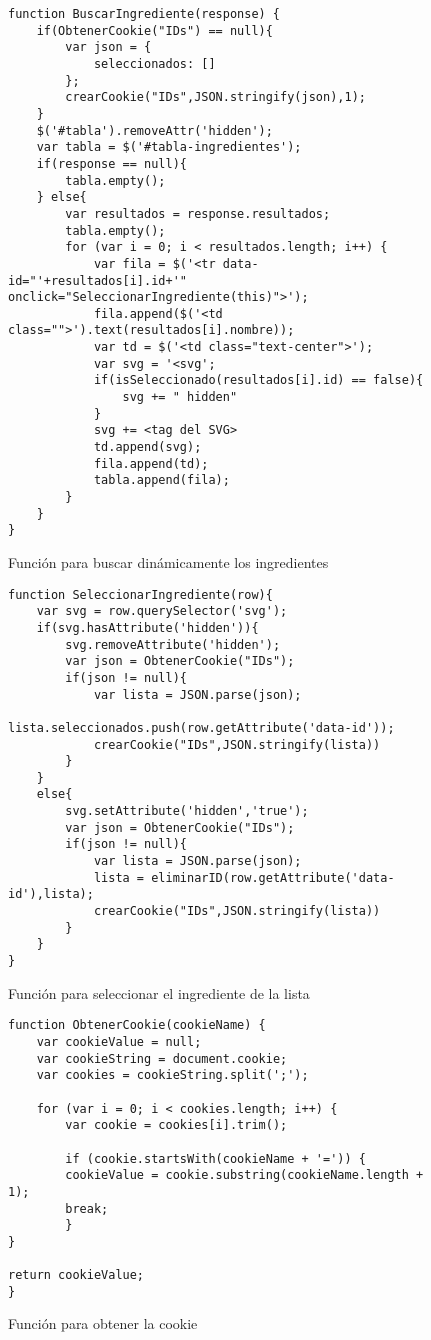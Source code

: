 \begin{figure}[H]
\begin{lstlisting}[style=consola]
function BuscarIngrediente(response) {
    if(ObtenerCookie("IDs") == null){
        var json = {
            seleccionados: []
        };
        crearCookie("IDs",JSON.stringify(json),1);
    }
    $('#tabla').removeAttr('hidden');
    var tabla = $('#tabla-ingredientes');
    if(response == null){
        tabla.empty();
    } else{
        var resultados = response.resultados;
        tabla.empty();
        for (var i = 0; i < resultados.length; i++) {
            var fila = $('<tr data-id="'+resultados[i].id+'" onclick="SeleccionarIngrediente(this)">');
            fila.append($('<td class="">').text(resultados[i].nombre));
            var td = $('<td class="text-center">');
            var svg = '<svg';
            if(isSeleccionado(resultados[i].id) == false){
                svg += " hidden"
            }
            svg += <tag del SVG>
            td.append(svg);
            fila.append(td);
            tabla.append(fila);
        }
    }
}
\end{lstlisting}
\caption{Función para buscar dinámicamente los ingredientes}
\label{sni:buscadorIngredientes}
\end{figure}

\begin{figure}[H]
\begin{lstlisting}[style=consola]
function SeleccionarIngrediente(row){
    var svg = row.querySelector('svg');
    if(svg.hasAttribute('hidden')){
        svg.removeAttribute('hidden');
        var json = ObtenerCookie("IDs");
        if(json != null){
            var lista = JSON.parse(json);
            lista.seleccionados.push(row.getAttribute('data-id'));
            crearCookie("IDs",JSON.stringify(lista))
        }
    }
    else{
        svg.setAttribute('hidden','true');
        var json = ObtenerCookie("IDs");
        if(json != null){
            var lista = JSON.parse(json);
            lista = eliminarID(row.getAttribute('data-id'),lista);
            crearCookie("IDs",JSON.stringify(lista))
        }
    }
}
\end{lstlisting}
\caption{Función para seleccionar el ingrediente de la lista}
\label{sni:seleccion}
\end{figure}

\begin{figure}[H]
\begin{lstlisting}[style=consola]
function ObtenerCookie(cookieName) {
    var cookieValue = null;
    var cookieString = document.cookie;
    var cookies = cookieString.split(';');

    for (var i = 0; i < cookies.length; i++) {
        var cookie = cookies[i].trim();

        if (cookie.startsWith(cookieName + '=')) {
        cookieValue = cookie.substring(cookieName.length + 1);
        break;
        }
}

return cookieValue;
}
\end{lstlisting}
\caption{Función para obtener la cookie}
\label{sni:cookie-Obtener}
\end{figure}

